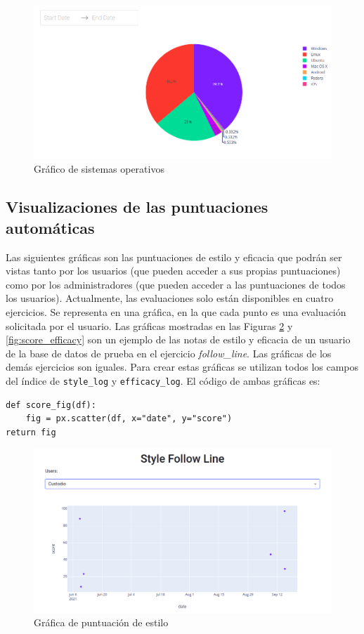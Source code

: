 \begin{figure}[H]
    \centering
    \includegraphics[width=15cm, keepaspectratio]{img/os.png}
    \caption{Gráfico de sistemas operativos}
    \label{fig:os}
\end{figure}
\subsection{Visualizaciones de las puntuaciones automáticas}
Las siguientes gráficas son las puntuaciones de estilo y eficacia que podrán ser vistas tanto por los usuarios (que pueden acceder a sus propias puntuaciones) como por los administradores (que pueden acceder a las puntuaciones de todos los usuarios).  Actualmente, las evaluaciones solo están disponibles en cuatro ejercicios. Se representa en una gráfica, en la que cada punto es una evaluación solicitada por el usuario. Las gráficas mostradas en las Figuras \ref{fig:score} y \ref{fig:score_efficacy}  son un ejemplo de las notas de estilo y eficacia de un usuario de la base de datos de prueba en el ejercicio \textit{follow\_line}. Las gráficas de los demás ejercicios son iguales. Para crear estas gráficas se utilizan todos los campos del índice de \texttt{style\_log} y \texttt{efficacy\_log}. El código de ambas gráficas es:
\begin{verbatim}
def score_fig(df):
    fig = px.scatter(df, x="date", y="score")
return fig
\end{verbatim}




\begin{figure}[H]
    \centering
    \includegraphics[width=17cm, keepaspectratio]{img/score.png}
    \caption{Gráfica de puntuación de estilo}
    \label{fig:score}
\end{figure}


